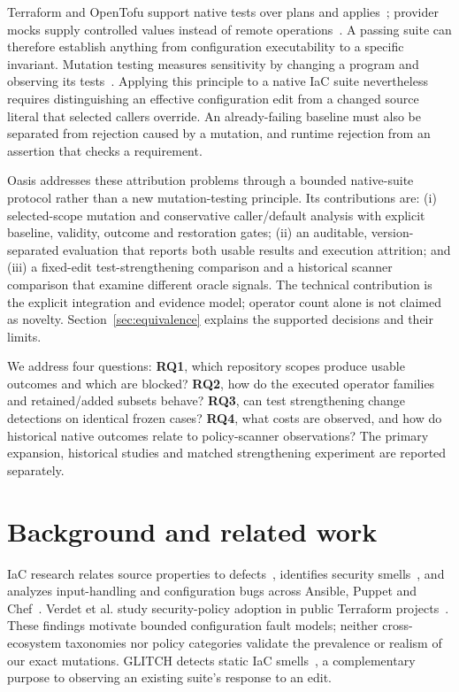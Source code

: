 Terraform and OpenTofu support native tests over plans and applies~\cite{terraformtests,tofutests}; provider mocks supply controlled values instead of remote operations~\cite{mocks}. A passing suite can therefore establish anything from configuration executability to a specific invariant. Mutation testing measures sensitivity by changing a program and observing its tests~\cite{jia,papadakis}. Applying this principle to a native IaC suite nevertheless requires distinguishing an effective configuration edit from a changed source literal that selected callers override. An already-failing baseline must also be separated from rejection caused by a mutation, and runtime rejection from an assertion that checks a requirement.

Oasis addresses these attribution problems through a bounded native-suite protocol rather than a new mutation-testing principle. Its contributions are: (i) selected-scope mutation and conservative caller/default analysis with explicit baseline, validity, outcome and restoration gates; (ii) an auditable, version-separated evaluation that reports both usable results and execution attrition; and (iii) a fixed-edit test-strengthening comparison and a historical scanner comparison that examine different oracle signals. The technical contribution is the explicit integration and evidence model; operator count alone is not claimed as novelty. Section~\ref{sec:equivalence} explains the supported decisions and their limits.

We address four questions: \textbf{RQ1}, which repository scopes produce usable outcomes and which are blocked? \textbf{RQ2}, how do the executed operator families and retained/added subsets behave? \textbf{RQ3}, can test strengthening change detections on identical frozen cases? \textbf{RQ4}, what costs are observed, and how do historical native outcomes relate to policy-scanner observations? The primary expansion, historical studies and matched strengthening experiment are reported separately.

\section{Background and related work}\label{sec:related}
IaC research relates source properties to defects~\cite{rahman}, identifies security smells~\cite{seven}, and analyzes input-handling and configuration bugs across Ansible, Puppet and Chef~\cite{drosos}. Verdet et al. study security-policy adoption in public Terraform projects~\cite{verdet}. These findings motivate bounded configuration fault models; neither cross-ecosystem taxonomies nor policy categories validate the prevalence or realism of our exact mutations. GLITCH detects static IaC smells~\cite{glitch,glitchdemo}, a complementary purpose to observing an existing suite's response to an edit.

